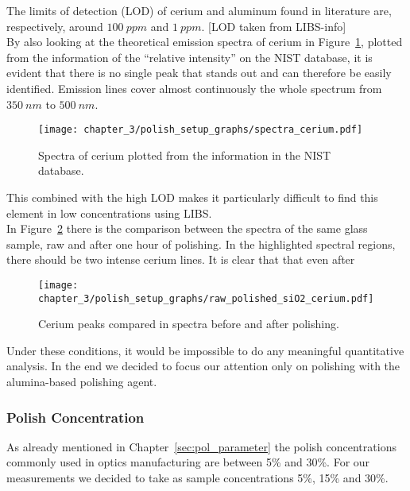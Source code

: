 The limits of detection (LOD) of cerium and aluminum found in literature are, respectively, around $100 \: ppm$ and $1\: ppm$. [LOD taken from LIBS-info]
\\
By also looking at the theoretical emission spectra of cerium in Figure~\ref{fig:ce_plot_nist}, plotted from the information of the “relative intensity” on the NIST database, it is evident that there is no single peak that stands out and can therefore be easily identified. Emission lines cover almost continuously the whole spectrum from $350 \: nm$ to $500 \: nm$.
\begin{figure}[H]
    \centering
    \texttt{[image: chapter\_3/polish\_setup\_graphs/spectra\_cerium.pdf]} 
    \vspace*{-30pt}
    \caption{Spectra of cerium plotted from the information in the NIST database. }
    \label{fig:ce_plot_nist}
\end{figure}
This combined with the high LOD makes it particularly difficult to find this element in low concentrations using LIBS.
\\
In Figure~\ref{fig:ce_peaks_raw_polished} there is the comparison between the spectra of the same glass sample, raw and after one hour of polishing. In the highlighted spectral regions, there should be two intense cerium lines. It is clear that that even after 
\begin{figure}[H]
    \centering
    \texttt{[image: chapter\_3/polish\_setup\_graphs/raw\_polished\_siO2\_cerium.pdf]} 
    \vspace*{-30pt}
    \caption{Cerium peaks compared in spectra before and after polishing. }
    \label{fig:ce_peaks_raw_polished}
\end{figure}
Under these conditions, it would be impossible to do any meaningful quantitative analysis. In the end we decided to focus our attention only on polishing with the alumina-based polishing agent.

\subsubsection{Polish Concentration}
\label{subsubsec:polish_concentration_setup}

As already mentioned in Chapter~\ref{sec:pol_parameter} the polish concentrations commonly used in optics manufacturing are between 5\% and 30\%. For our measurements we decided to take as sample concentrations 5\%, 15\% and 30\%. 

